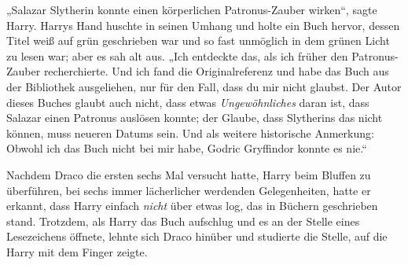 „Salazar Slytherin konnte einen körperlichen Patronus-Zauber wirken“, sagte Harry. Harrys Hand huschte in seinen Umhang und holte ein Buch hervor, dessen Titel weiß auf grün geschrieben war und so fast unmöglich in dem grünen Licht zu lesen war; aber es sah alt aus.
„Ich entdeckte das, als ich früher den Patronus-Zauber recherchierte. Und ich fand die Originalreferenz und habe das Buch aus der Bibliothek ausgeliehen, nur für den Fall, dass du mir nicht glaubst. Der Autor dieses Buches glaubt auch nicht, dass etwas \emph{Ungewöhnliches} daran ist, dass Salazar einen Patronus auslösen konnte; der Glaube, dass Slytherins das nicht können, muss neueren Datums sein. Und als weitere historische Anmerkung: Obwohl ich das Buch nicht bei mir habe, Godric Gryffindor konnte es nie.“

Nachdem Draco die ersten sechs Mal versucht hatte, Harry beim Bluffen zu überführen, bei sechs immer lächerlicher werdenden Gelegenheiten, hatte er erkannt, dass Harry einfach \emph{nicht} über etwas log, das in Büchern geschrieben stand. Trotzdem, als Harry das Buch aufschlug und es an der Stelle eines Lesezeichens öffnete, lehnte sich Draco hinüber und studierte die Stelle, auf die Harry mit dem Finger zeigte.


